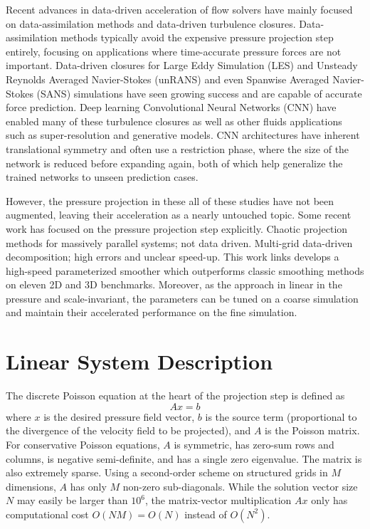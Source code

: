 \documentclass[review]{elsarticle}
\begin{document}
Recent advances in data-driven acceleration of flow solvers have mainly focused on data-assimilation methods and data-driven turbulence closures. Data-assimilation methods typically avoid the expensive pressure projection step entirely, focusing on applications where time-accurate pressure forces are not important. Data-driven closures for Large Eddy Simulation (LES) and Unsteady Reynolds Averaged Navier-Stokes (unRANS) and even Spanwise Averaged Navier-Stokes (SANS) simulations have seen growing success and are capable of accurate force prediction. Deep learning Convolutional Neural Networks (CNN) have enabled many of these turbulence closures as well as other fluids applications such as super-resolution and generative models. CNN architectures have inherent translational symmetry and often use a restriction phase, where the size of the network is reduced before expanding again, both of which help generalize the trained networks to unseen prediction cases. 

However, the pressure projection in these all of these studies have not been augmented, leaving their acceleration as a nearly untouched topic. Some recent work has focused on the pressure projection step explicitly. Chaotic projection methods for massively parallel systems; not data driven. Multi-grid data-driven decomposition; high errors and unclear speed-up. This work links develops a high-speed parameterized smoother which outperforms classic smoothing methods on eleven 2D and 3D benchmarks. Moreover, as the approach in linear in the pressure and scale-invariant, the parameters can be tuned on a coarse simulation and maintain their accelerated performance on the fine simulation. 

\section{Linear System Description}

The discrete Poisson equation at the heart of the projection step is defined as
\begin{equation}\label{eq:axb}
    A x = b
\end{equation}
where $x$ is the desired pressure field vector, $b$ is the source term (proportional to the divergence of the velocity field to be projected), and $A$ is the Poisson matrix. For conservative Poisson equations, $A$ is symmetric, has zero-sum rows and columns, is negative semi-definite, and has a single zero eigenvalue. The matrix is also extremely sparse. Using a second-order scheme on structured grids in $M$ dimensions, $A$ has only $M$ non-zero sub-diagonals. While the solution vector size $N$ may easily be larger than $10^6$, the matrix-vector multiplication $Ax$ only has computational cost $O(NM)=O(N)$ instead of $O(N^2)$.
\end{document}
